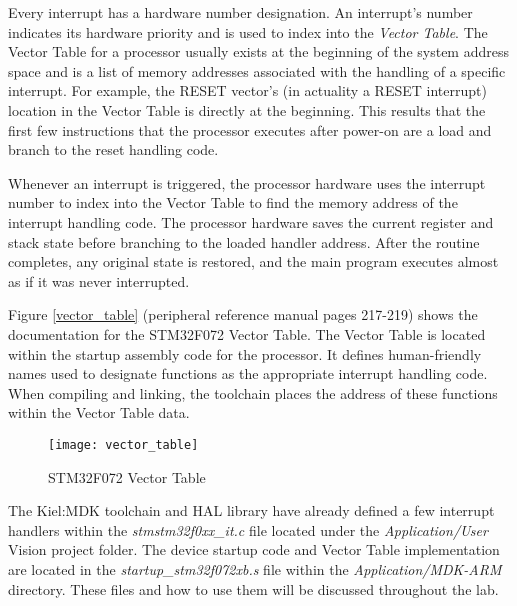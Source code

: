 \documentclass[11pt,fleqn]{book} %
\begin{document}
Every interrupt has a hardware number designation. An interrupt's number indicates its hardware priority and is used to index into the \textit{Vector Table}. The Vector Table for a processor usually exists at the beginning of the system address space and is a list of memory addresses associated with the handling of a specific interrupt. For example, the RESET vector's (in actuality a RESET interrupt) location in the Vector Table is directly at the beginning. This results that the first few instructions that the processor executes after power-on are a load and branch to the reset handling code. 

Whenever an interrupt is triggered, the processor hardware uses the interrupt number to index into the Vector Table to find the memory address of the interrupt handling code. The processor hardware saves the current register and stack state before branching to the loaded handler address. After the routine completes, any original state is restored, and the main program executes almost as if it was never interrupted. 

Figure \vref{vector_table} (peripheral reference manual pages 217-219) shows the documentation for the STM32F072 Vector Table. The Vector Table is located within the startup assembly code for the processor. It defines human-friendly names used to designate functions as the appropriate interrupt handling code. When compiling and linking, the toolchain places the address of these functions within the Vector Table data.  

\begin{figure}[]
    \centering\texttt{[image: vector\_table]}
    \caption{STM32F072 Vector Table}
    \label{vector_table}
\end{figure}


The Kiel:MDK toolchain and HAL library have already defined a few interrupt handlers within the \textit{stmstm32f0xx\_it.c} file located under the \textit{Application/User} {\textmu}Vision project folder. The device startup code and Vector Table implementation are located in the \textit{startup\_stm32f072xb.s} file within the \textit{Application/MDK-ARM} directory. These files and how to use them will be discussed throughout the lab.

\end{document}
